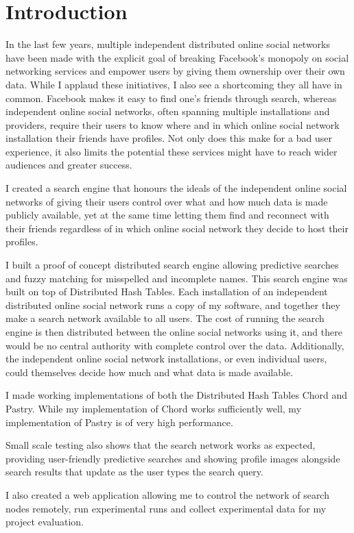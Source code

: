 


\chapter{Introduction}
In the last few years, multiple independent distributed online social networks have been made with the explicit goal of breaking Facebook's monopoly on social networking services and empower users by giving them ownership over their own data.
While I applaud these initiatives, I also see a shortcoming they all have in common. Facebook makes it easy to find one's friends through search, whereas independent online social networks, often spanning multiple installations and providers, require their users to know where and in which online social network installation their friends have profiles. Not only does this make for a bad user experience, it also limits the potential these services might have to reach wider audiences and greater success.

I created a search engine that honours the ideals of the independent online social networks of giving their users control over what and how much data is made publicly available, yet at the same time letting them find and reconnect with their friends regardless of in which online social network they decide to host their profiles.

I built a proof of concept distributed search engine allowing predictive searches and fuzzy matching for misspelled and incomplete names. This search engine was built on top of Distributed Hash Tables. Each installation of an independent distributed online social network runs a copy of my software, and together they make a search network available to all users. The cost of running the search engine is then distributed between the online social networks using it, and there would be no central authority with complete control over the data. Additionally, the independent online social network installations, or even individual users, could themselves decide how much and what data is made available.

I made working implementations of both the Distributed Hash Tables Chord and Pastry. While my implementation of Chord works sufficiently well, my implementation of Pastry is of very high performance.

Small scale testing also shows that the search network works as expected, providing user-friendly predictive searches and showing profile images alongside search results that update as the user types the search query.

I also created a web application allowing me to control the network of search nodes remotely, run experimental runs and collect experimental data for my project evaluation.
